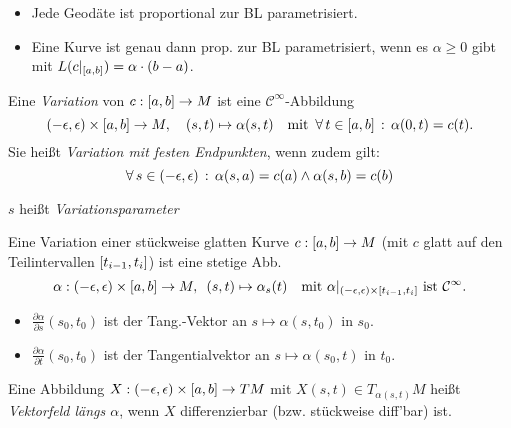 \documentclass{cheat-sheet}
\newcommand{\vinterval}{\ointerval{-\epsilon}{\epsilon}} %
\newcommand{\abinterval}{\cinterval{a}{b}} %
\newcommand{\Cont}{\mathcal{C}} %
\begin{document}
\begin{bem}
  \begin{itemize}
    \item Jede Geodäte ist proportional zur BL parametrisiert.
    \item Eine Kurve ist genau dann prop. zur BL parametrisiert, wenn es $\alpha \geq 0$ gibt mit $L(c|_{\abinterval}) = \alpha \cdot (b - a)$.
  \end{itemize}
\end{bem}

\begin{defn}
  Eine \emph{Variation} von $c : \abinterval \to M$ ist eine $\Cont^\infty$-Abbildung
  \[
    \vinterval \times \abinterval \to M, \quad
    (s, t) \mapsto \alpha(s, t)
    \quad \text{mit} \enspace
    \fa{t \in \abinterval} \alpha(0, t) = c(t).
  \]
  Sie heißt \emph{Variation mit festen Endpunkten}, wenn zudem gilt:
  \[
    \fa{s \in \vinterval}
    \alpha(s, a) = c(a) \wedge \alpha(s, b) = c(b)
  \]
\end{defn}

\begin{sprech}
  $s$ heißt \emph{Variationsparameter}
\end{sprech}

\begin{defn}
  Eine Variation einer stückweise glatten Kurve $c : \abinterval \to M$ (mit $c$ glatt auf den Teilintervallen $\left[ t_{i-1}, t_i \right]$) ist eine stetige Abb.
  \[
    \alpha : \vinterval \times \abinterval \to M,
    \enspace (s, t) \mapsto \alpha_s(t)
    \quad \text{mit }
    \alpha|_{\vinterval \times \cinterval{t_{i-1}}{t_i}} \text{ ist } \Cont^\infty.
  \]
\end{defn}

\begin{nota}
  \begin{itemize}
    \item $\tfrac{\partial \alpha}{\partial s} (s_0, t_0)$ ist der Tang.-Vektor an $s {\mapsto} \alpha(s, t_0)$ in $s_0$.
    \item $\tfrac{\partial \alpha}{\partial t} (s_0, t_0)$ ist der Tangentialvektor an $s \mapsto \alpha(s_0, t)$ in $t_0$.
  \end{itemize}
\end{nota}

\begin{defn}
  Eine Abbildung $X : \vinterval \times \abinterval \to TM$ mit $X(s, t) \in T_{\alpha(s, t)} M$ heißt \emph{Vektorfeld längs $\alpha$}, wenn $X$ differenzierbar (bzw. stückweise diff'bar) ist.
\end{defn}
\end{document}
